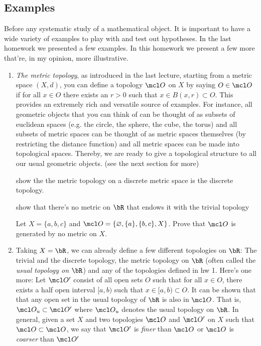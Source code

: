 \documentclass{pset}
\begin{document}
\maketitle

\pagebreak

\subsection{Examples}
Before any systematic study of a mathematical object. It is important to have a wide variety of examples to play with and test out hypotheses. In the last homework we presented a few examples. In this homework we present a few more that're, in my opinion, more illustrative. 
\begin{enumerate}[label=(\alph*)]
    \item \emph{The metric topology}, as introduced in the last lecture, starting from a metric space $(X, d)$, you can define a topology $\mcl O$ on $X$ by saying $O\in \mcl O$ if for all $x\in O$ there exists an $r>0$ such that $x\in B(x, r)\subset O$. This provides an extremely rich and versatile source of examples. For instance, all geometric objects that you can think of can be thought of as subsets of euclidean spaces (e.g. the circle, the sphere, the cube, the torus) and all subsets of metric spaces can be thought of as metric spaces themselves (by restricting the distance function) and all metric spaces can be made into topological spaces. Thereby, we are ready to give a topological structure to all our usual geometric objects. (see the next section for more)
    \begin{exercise}
        show the the metric topology on a discrete metric space is the discrete topology.
    \end{exercise}
    \begin{exercise}
        show that there's no metric on $\bR$ that endows it with the trivial topology
    \end{exercise}
    \begin{exercise}
        Let $X=\{a, b, c\}$ and $\mcl O = \{\varnothing, \{a\}, \{b, c\}, X\}$. Prove that $\mcl O$ is generated by no metric on $X$.
    \end{exercise}
    \item Taking $X=\bR$, we can already define a few different topologies on $\bR$: The trivial and the discrete topology, the metric topology on $\bR$ (often called the \emph{usual topology on $\bR$}) and any of the topologies defined in hw 1. Here's one more: Let $\mcl O'$ consist of all open sets $O$ such that for all $x\in O$, there exists a half open interval $[a, b)$ such that $x\in[a, b)\subset O$. It can be shown that that any open set in the usual topology of $\bR$ is also in $\mcl O$. That is, $\mcl O_u\subset \mcl O'$ where $\mcl O_u$ denotes the usual topology on $\bR$. In general, given a set $X$ and two topologies $\mcl O$ and $\mcl O'$ on $X$ such that $\mcl O\subset \mcl O$, we say that $\mcl O'$ is \emph{finer} than $\mcl O$ or $\mcl O$ is \emph{coarser} than $\mcl O'$

\end{enumerate}
\end{document}
